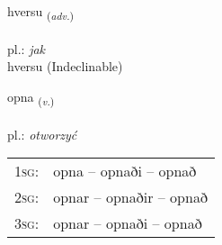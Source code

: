 \documentclass[frontgrid, backgrid]{flacards}\usepackage[]{graphicx}\usepackage[]{xcolor}
\begin{document}

\renewcommand{\flhead}{\vskip5pt \fboxsep=0pt {\small\bfseries\footnotesize Atviksorð | Adverb}}
\renewcommand{\fcfoot}{\vskip5pt \fboxsep=0pt \hspace{2pt}{\small\bfseries\footnotesize 1K}}

\renewcommand{\blhead}{\vskip5pt {\small\bfseries\footnotesize Atviksorð | Adverb }}
\renewcommand{\bcfoot}{\vskip5pt \hspace{2pt}{\small\bfseries\footnotesize 1K}}


{hversu \small{\textsubscript{(\textit{adv.})}} \\[1ex]
\textphonetic{[kʰvɛr̥sʏ]} \\
pl.: \emph{jak} \\  [2ex]
hversu (Indeclinable)}

\renewcommand{\flhead}{\vskip5pt \fboxsep=0pt {\small\bfseries\footnotesize Sagnorð | Verb}}
\renewcommand{\fcfoot}{\vskip5pt \fboxsep=0pt \hspace{2pt}{\small\bfseries\footnotesize 1K}}

\renewcommand{\blhead}{\vskip5pt {\small\bfseries\footnotesize Sagnorð | Verb }}
\renewcommand{\bcfoot}{\vskip5pt \hspace{2pt}{\small\bfseries\footnotesize 1K}}


{opna \small{\textsubscript{(\textit{v.})}} \\[1ex] %
\textphonetic{[ɔhpna]} \\
pl.: \emph{otworzyć} \\  [2ex]
\renewcommand*{\arraystretch}{0.8}
\begin{tabular}{p{1cm}l}
\textsc{1sg}: & opna -- opnaði -- opnað \\ 
\textsc{2sg}: & opnar -- opnaðir -- opnað \\ 
\textsc{3sg}: & opnar -- opnaði -- opnað \\ 
\end{tabular}
}

\renewcommand{\flhead}{\vskip5pt \fboxsep=0pt {\small\bfseries\footnotesize Sagnorð | Verb}}
\renewcommand{\fcfoot}{\vskip5pt \fboxsep=0pt \hspace{2pt}{\small\bfseries\footnotesize 1K}}
\end{document}
